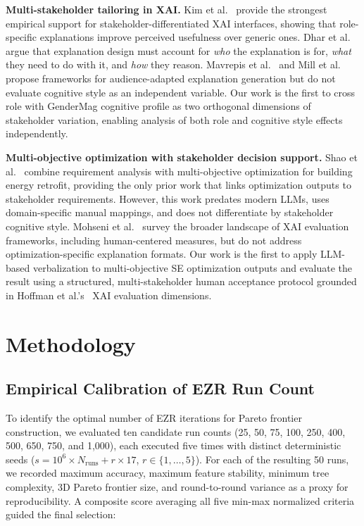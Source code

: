 \documentclass[sigconf,review]{acmart}
\begin{document}
\textbf{Multi-stakeholder tailoring in XAI.}
Kim et al.~\cite{kim2024stakeholder} provide the strongest empirical
support for stakeholder-differentiated XAI interfaces, showing that
role-specific explanations improve perceived usefulness over generic
ones. Dhar et al.~\cite{dhar2025beyond} argue that explanation design
must account for \textit{who} the explanation is for, \textit{what}
they need to do with it, and \textit{how} they reason. Mavrepis et
al.~\cite{mavrepis2024xai} and Mill et al.~\cite{mill2024sage} propose
frameworks for audience-adapted explanation generation but do not
evaluate cognitive style as an independent variable. Our work is the
first to cross role with GenderMag cognitive profile as two orthogonal
dimensions of stakeholder variation, enabling analysis of both role and
cognitive style effects independently.

\textbf{Multi-objective optimization with stakeholder decision support.}
Shao et al.~\cite{shao2014integrating} combine requirement analysis with
multi-objective optimization for building energy retrofit, providing the
only prior work that links optimization outputs to stakeholder
requirements. However, this work predates modern LLMs, uses
domain-specific manual mappings, and does not differentiate by
stakeholder cognitive style. Mohseni et al.~\cite{mohseni2021multidisciplinary}
survey the broader landscape of XAI evaluation frameworks, including
human-centered measures, but do not address optimization-specific
explanation formats. Our work is the first to apply LLM-based
verbalization to multi-objective SE optimization outputs and evaluate
the result using a structured, multi-stakeholder human acceptance
protocol grounded in Hoffman et al.'s~\cite{hoffman2023measures} XAI
evaluation dimensions.

\section{Methodology}

\subsection{Empirical Calibration of EZR Run Count}
\label{subsec:run-calibration}

To identify the optimal number of EZR iterations for Pareto frontier construction,
we evaluated ten candidate run counts (25, 50, 75, 100, 250, 400, 500, 650, 750,
and 1{,}000), each executed five times with distinct deterministic seeds
($s = 10^{6} \times N_{\text{runs}} + r \times 17$, $r \in \{1,\ldots,5\}$).
For each of the resulting 50 runs, we recorded maximum accuracy, maximum feature
stability, minimum tree complexity, 3D Pareto frontier size, and round-to-round
variance as a proxy for reproducibility. A composite score averaging all five
min-max normalized criteria guided the final selection:
\end{document}
